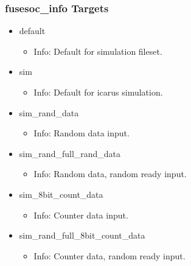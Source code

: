 \subsubsection{fusesoc\_info Targets}
\begin{itemize}
\item default
	\begin{itemize}
	\item[$\space$] Info: Default for simulation fileset.
	\end{itemize}
\item sim
	\begin{itemize}
	\item[$\space$] Info: Default for icarus simulation.
	\end{itemize}
\item sim\_rand\_data
	\begin{itemize}
	\item[$\space$] Info: Random data input.
	\end{itemize}
\item sim\_rand\_full\_rand\_data
	\begin{itemize}
	\item[$\space$] Info: Random data, random ready input.
	\end{itemize}
\item sim\_8bit\_count\_data
	\begin{itemize}
	\item[$\space$] Info: Counter data input.
	\end{itemize}
\item sim\_rand\_full\_8bit\_count\_data
	\begin{itemize}
	\item[$\space$] Info: Counter data, random ready input.
	\end{itemize}
\end{itemize}
